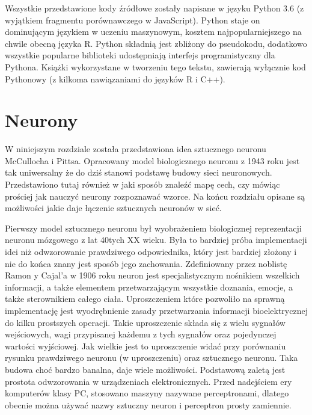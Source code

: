 \documentclass[12pt,a4paper,twoside,titlepage,openright]{book}
\begin{document}
Wszystkie przedstawione kody źródłowe zostały napisane w języku Python 3.6 (z wyjątkiem fragmentu porównawczego w JavaScript). Python staje on dominującym językiem w uczeniu maszynowym, kosztem najpopularniejszego na chwile obecną języka R. Python składnią jest zbliżony do pseudokodu, dodatkowo wszystkie popularne biblioteki udostępniają interfejs programistyczny dla Pythona. Książki wykorzystane w tworzeniu tego tekstu, zawierają wyłącznie kod Pythonowy (z kilkoma nawiązaniami do języków R i C++).


\chapter{Neurony}
W niniejszym rozdziale została przedstawiona idea sztucznego neuronu McCullocha i Pittsa. Opracowany model biologicznego neuronu z 1943 roku jest tak uniwersalny że do dziś stanowi podstawę budowy sieci neuronowych. Przedstawiono tutaj również w jaki sposób znaleźć mapę cech, czy mówiąc prościej jak nauczyć neurony rozpoznawać wzorce. Na końcu rozdziału opisane są możliwości jakie daje łączenie sztucznych neuronów w sieć.

Pierwszy model sztucznego neuronu był wyobrażeniem biologicznej reprezentacji neuronu mózgowego z lat 40tych XX wieku. Była to bardziej próba implementacji idei niż odwzorowanie prawdziwego odpowiednika, który jest bardziej złożony i nie do końca znany jest sposób jego zachowania. Zdefiniowany przez noblistę Ramon y Cajal'a w 1906 roku neuron jest specjalistycznym nośnikiem wszelkich informacji, a także elementem przetwarzającym wszystkie doznania, emocje, a także sterownikiem całego ciała. Uproszczeniem które pozwoliło na sprawną implementację jest wyodrębnienie zasady przetwarzania informacji bioelektrycznej do kilku prostszych operacji. Takie uproszczenie składa się z wielu sygnałów wejściowych, wagi przypisanej każdemu z tych sygnałów oraz pojedynczej wartości wyjściowej. Jak wielkie jest to uproszczenie widać przy porównaniu rysunku prawdziwego neuronu (w uproszczeniu) oraz sztucznego neuronu. Taka budowa choć bardzo banalna, daje wiele możliwości. Podstawową zaletą jest prostota odwzorowania w urządzeniach elektronicznych. Przed nadejściem ery komputerów klasy PC, stosowano maszyny nazywane perceptronami, dlatego obecnie można używać nazwy sztuczny neuron i perceptron prosty zamiennie. 
\end{document}
